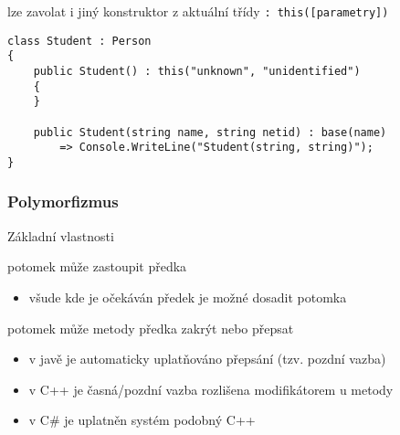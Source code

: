 \begin{frame}[fragile]
\begin{bitemize}{}
\item lze zavolat i jiný konstruktor z aktuální třídy \lstinline|: this([parametry])|
\end{bitemize}
\vfill
\begin{yesblock}
\begin{lstlisting}[basicstyle=\small]
class Student : Person
{
    public Student() : this("unknown", "unidentified") 
    { 
    }

    public Student(string name, string netid) : base(name) 
        => Console.WriteLine("Student(string, string)");
}
\end{lstlisting}
\end{yesblock}
\end{frame}






\begin{frame}[fragile]
\frametitle{Polymorfizmus}

\begin{bitemize}{Základní vlastnosti}
\item potomek může zastoupit předka
\begin{itemize}
\item všude kde je očekáván předek je možné dosadit potomka
\end{itemize}

\item potomek může metody předka zakrýt nebo přepsat
\begin{itemize}
\item v javě je automaticky uplatňováno přepsání (tzv. pozdní vazba)
\item v C++ je časná/pozdní vazba rozlišena modifikátorem u metody
\item v C\# je uplatněn systém podobný C++
\end{itemize}

\end{bitemize}
\end{frame}



